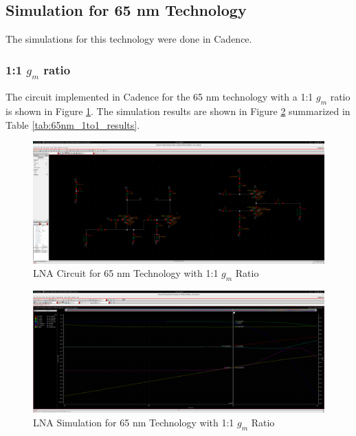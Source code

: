 \subsection{Simulation for 65 nm Technology}

The simulations for this technology were done in Cadence. 

\subsubsection{1:1 $g_m$ ratio}

The circuit implemented in Cadence for the 65 nm technology with a 1:1 $g_m$ ratio is shown in Figure \ref{fig:65nm_1to1-circ}. The simulation results are shown in Figure \ref{fig:65nm_1to1} summarized in Table \ref{tab:65nm_1to1_results}.
\begin{figure}[H]
    \centering
    \includegraphics[width=1\textwidth]{Images/65nm1To1Circ.png}
    \caption{LNA Circuit for 65 nm Technology with 1:1 $g_m$ Ratio}
    \label{fig:65nm_1to1-circ}
\end{figure}

\begin{figure}[H]
    \centering
    \includegraphics[width=1\textwidth]{Images/65nm1to1.png}
    \caption{LNA Simulation for 65 nm Technology with 1:1 $g_m$ Ratio}
    \label{fig:65nm_1to1}
\end{figure}

